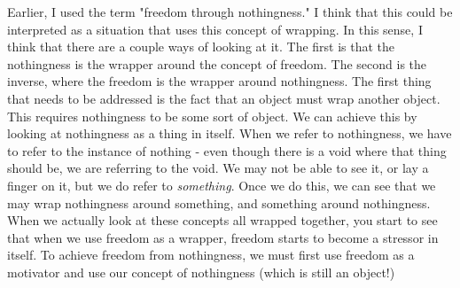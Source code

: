 \documentclass[12pt]{article}
\begin{document}
  Earlier, I used the term "freedom through nothingness." I think that this could be interpreted as a situation
  that uses this concept of wrapping. In this sense, I think that there are a couple ways of looking at it. The
  first is that the nothingness is the wrapper around the concept of freedom. The second is the inverse, where 
  the freedom is the wrapper around nothingness. The first thing that needs to be addressed is the fact that an
  object must wrap another object. This requires nothingness to be some sort of object. We can achieve this by
  looking at nothingness as a thing in itself. When we refer to nothingness, we have to refer to the instance
  of nothing - even though there is a void where that thing should be, we are referring to the void. We may not
  be able to see it, or lay a finger on it, but we do refer to \textit{something}. Once we do this, we can see
  that we may wrap nothingness around something, and something around nothingness. When we actually look at
  these concepts all wrapped together, you start to see that when we use freedom as a wrapper, freedom starts
  to become a stressor in itself. To achieve freedom from nothingness, we must first use freedom as a motivator
  and use our concept of nothingness (which is still an object!) 
\end{document}
